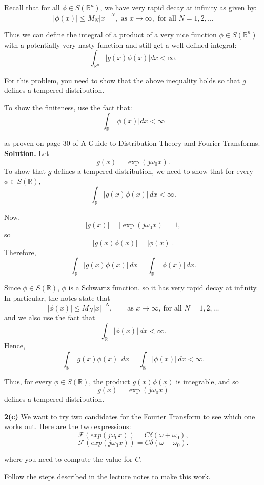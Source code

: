 \documentclass[11pt]{article}
\begin{document}
	Recall that for all $\phi \in S(\mathbb{R}^n)$, we have very rapid decay at infinity as given by:
	\[
	|\phi(x)| \le M_N |x|^{-N}, \text{ as } x \to \infty, \text{ for all } N = 1, 2, \dots
	\]
	
	Thus we can define the integral of a product of a very nice function $\phi \in S(\mathbb{R}^n)$ with a potentially very nasty function and still get a well-defined integral:
	\[
	\int_{\mathbb{R}^n} |g(x)\phi(x)| dx < \infty.
	\]
	
	For this problem, you need to show that the above inequality holds so that $g$ defines a tempered distribution.
	
	To show the finiteness, use the fact that:
	\[
	\int_{\mathbb{R}} |\phi(x)| dx < \infty
	\]
	
	as proven on page 30 of A Guide to Distribution Theory and Fourier Transforms.\\
	
	\textbf{Solution.}
	Let
	\[
	g(x)=\exp(j\omega_0 x).
	\]
	To show that \(g\) defines a tempered distribution, we need to show that for every
	\(\phi\in S(\mathbb{R})\),
	\[
	\int_{\mathbb{R}} |g(x)\phi(x)|\,dx < \infty.
	\]
	
	Now,
	\[
	|g(x)|=\left|\exp(j\omega_0 x)\right|=1,
	\]
	so
	\[
	|g(x)\phi(x)|
	=
	|\phi(x)|.
	\]
	Therefore,
	\[
	\int_{\mathbb{R}} |g(x)\phi(x)|\,dx
	=
	\int_{\mathbb{R}} |\phi(x)|\,dx.
	\]
	
	Since \(\phi\in S(\mathbb{R})\), \(\phi\) is a Schwartz function, so it has very rapid decay at infinity. In particular, the notes state that
	\[
	|\phi(x)| \le M_N |x|^{-N}, \qquad \text{as } x\to\infty,\ \text{for all } N=1,2,\dots
	\]
	and we also use the fact that
	\[
	\int_{\mathbb{R}} |\phi(x)|\,dx < \infty.
	\]
	Hence,
	\[
	\int_{\mathbb{R}} |g(x)\phi(x)|\,dx
	=
	\int_{\mathbb{R}} |\phi(x)|\,dx
	<\infty.
	\]
	
	Thus, for every \(\phi\in S(\mathbb{R})\), the product \(g(x)\phi(x)\) is integrable, and so
	\[
	g(x)=\exp(j\omega_0 x)
	\]
	defines a tempered distribution.
	
	\newpage
	
	\textbf{2(c)} We want to try two candidates for the Fourier Transform to see which one works out. Here are the two expressions:
	\[
	\mathcal{F}(exp(j\omega_0 x)) = C\delta(\omega + \omega_0),
	\]
	\[
	\mathcal{F}(exp(j\omega_0 x)) = C\delta(\omega - \omega_0).
	\]
	
	where you need to compute the value for $C$.
	
	Follow the steps described in the lecture notes to make this work.
	
\end{document}
